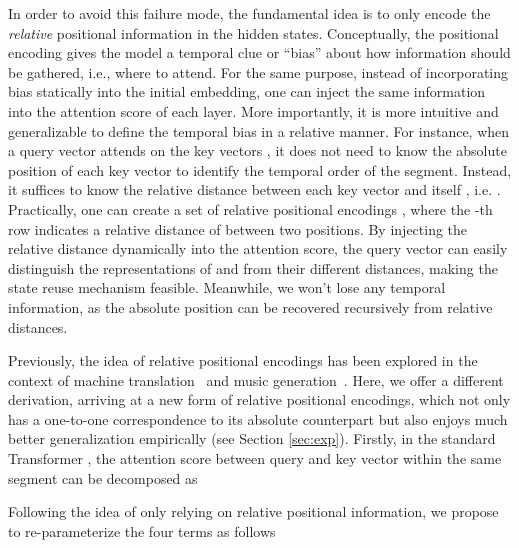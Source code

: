 \documentclass[11pt,a4paper]{article}
\begin{document}
In order to avoid this failure mode, the fundamental idea is to only encode the \textit{relative} positional information in the hidden states.
Conceptually, the positional encoding gives the model a temporal clue or ``bias'' about how information should be gathered, i.e., where to attend.
For the same purpose, instead of incorporating bias statically into the initial embedding, one can inject the same information into the attention score of each layer.
More importantly, it is more intuitive and generalizable to define the temporal bias in a relative manner.
For instance, when a query vector  attends on the key vectors , it does not need to know the absolute position of each key vector to identify the temporal order of the segment.
Instead, it suffices to know the relative distance between each key vector  and itself , i.e. . Practically, one can create a set of relative positional encodings , where the -th row  indicates a relative distance of  between two positions.
By injecting the relative distance dynamically into the attention score, the query vector can easily distinguish the representations of  and  from their different distances, making the state reuse mechanism feasible.
Meanwhile, we won't lose any temporal information, as the absolute position can be recovered recursively from relative distances.

Previously, the idea of relative positional encodings has been explored in the context of machine translation~\citep{shaw2018self} and music generation~\citep{huang2018improved}.
Here, we offer a different derivation, arriving at a new form of relative positional encodings, which not only has a one-to-one correspondence to its absolute counterpart but also enjoys much better generalization empirically (see Section \ref{sec:exp}).
Firstly, in the standard Transformer \citep{vaswani2017attention}, the attention score between query  and key vector  within the same segment can be decomposed as
\par\nobreak
\vspace{-0.5em}
\small

\normalsize
\vspace{-1em}

Following the idea of only relying on relative positional information, we propose to re-parameterize the four terms as follows
\par\nobreak
\vspace{-0.5em}
\small

\normalsize
\vspace{-1em}
\end{document}
